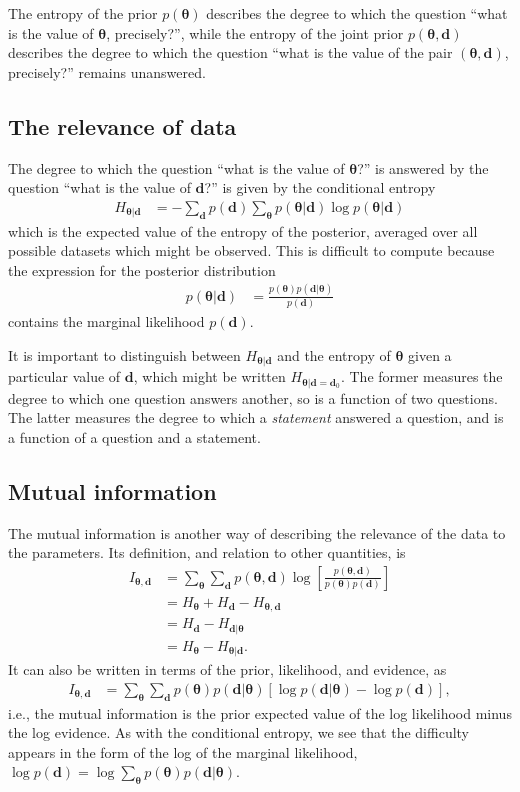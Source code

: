 \documentclass[entropy,article,accept,oneauthor,pdftex,10pt,a4paper]{mdpi}
\renewcommand{\d}{\boldsymbol{d}}
\newcommand{\x}{\boldsymbol{\theta}}
\begin{document}
The entropy of the prior $p(\x)$ describes the degree to which the question
``what is the value of $\x$, precisely?'', while the
entropy of the joint prior $p(\x, \d)$
describes the degree to which the question
``what is the value of the pair $(\x, \d)$, precisely?'' remains unanswered.

\subsection{The relevance of data}
The degree to which the question ``what is the value of $\x$?'' is
answered by the question ``what is the value of $\d$?'' is given by the
conditional entropy
\begin{align}
H_{\x | \d} &= - \sum_{\d} p(\d) \sum_{\x} p(\x | \d) \log p(\x | \d)
\end{align}
which is the expected value of the entropy of the posterior, averaged over
all possible datasets which might be observed.
This is difficult to compute because the expression
for the posterior distribution
\begin{align}
p(\x | \d) &= \frac{p(\x)p(\d | \x)}{p(\d)}
\end{align}
contains the marginal likelihood $p(\d)$.

It is important to distinguish between $H_{\x | \d}$ and the
entropy of $\x$ given a particular value of $\d$, which might be written
$H_{\x | \d=\d_0}$.
The former measures the degree to which one question answers
another, so is a function of two questions. The latter measures the
degree to which a {\em statement} answered a question, and is a function
of a question and a statement.



\subsection{Mutual information}
The mutual information is another way of describing the relevance of the
data to the parameters. Its definition, and relation to other quantities, is
\begin{align}
I_{\x, \d} &= \sum_{\x} \sum_{\d} p(\x, \d)
                       \log\left[\frac{p(\x, \d)}{p(\x)p(\d)}\right]\\
           &= H_{\x} + H_{\d} - H_{\x, \d}\\
           &= H_{\d} - H_{\d | \x}\\
           &= H_{\x} - H_{\x | \d}.
\end{align}
It can also be written in terms of the prior, likelihood, and evidence,
as
\begin{align}
I_{\x, \d} &= \sum_{\x} \sum_{\d} p(\x)p(\d | \x)
              \left[\log p(\d | \x) - \log p(\d)\right],
\end{align}
i.e., the mutual information is the prior expected value of the
log likelihood minus the log evidence.
As with the conditional entropy, we see that the difficulty appears in the
form of the log of the marginal likelihood,
$\log p(\d) = \log \sum_{\x} p(\x)p(\d | \x)$.
\end{document}
